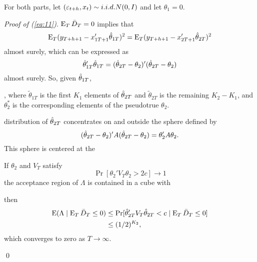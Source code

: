 \documentclass[12pt]{article}
\begin{document}
For both parts, let $(\varepsilon_{t+h}, x_{t}) \sim i.i.d. N(0,I)$ and let
$\theta_1 = 0$.

\noindent
\emph{Proof of (\ref{eq:11})}. $\operatorname{E}_T \bar{D}_{T} = 0$ implies that
\begin{equation*}
  \operatorname{E}_T (y_{T+h+1} - x_{1T+1}'\hat\theta_{1T})^2
  = \operatorname{E}_T (y_{T+h+1} - x_{2T+1}'\hat\theta_{2T})^2
\end{equation*}
almost surely, which can be expressed as
\begin{equation*}
  \hat\theta_{1T}'\hat\theta_{1T} = (\hat\theta_{2T} - \theta_2)'(\hat\theta_{2T} - \theta_2)
\end{equation*}
almost surely. So, given $\hat\theta_{1T}$,

, where $\tilde\theta_{1T}$ is the first $K_1$ elements
of $\hat\theta_{2T}$ and $\tilde\theta_{2T}$ is the remaining $K_2 - K_1$, and
$\theta_2^*$ is the corresponding elements of the pseudotrue $\theta_2$.


distribution of $\hat\theta_{2T}$ concentrates on and outside the sphere
defined by
\begin{equation*}
  (\hat\theta_{2T} - \theta_2)' A (\hat\theta_{2T} - \theta_2) = \theta_2' A \theta_2.
\end{equation*}
This sphere is centered at the

If $\theta_2$ and $V_T$ satisfy
\begin{equation*}
  \Pr[\theta_2' V_T \theta_2 > 2 c] \to 1
\end{equation*}
the acceptance region of $\Lambda$ is contained in a cube with

then
\begin{align*}
  \operatorname{E}(\Lambda \mid \operatorname{E}_T \bar{D}_{T} \leq 0)
  &\leq \Pr[ \hat\theta_{2T}' V_T \hat\theta_{2T} < c \mid \operatorname{E}_T \bar{D}_{T} \leq 0] \\
  &\leq (1/2)^{K_2},
\end{align*}
which converges to zero as $T \to \infty$.

\qed



\clearpage
\end{document}
